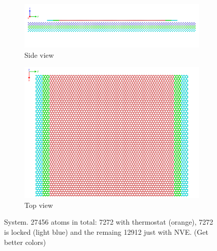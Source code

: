 \begin{figure}[H]
  \centering
  \begin{subfigure}[b]{0.80\textwidth}
      \centering
      \includegraphics[width=\textwidth]{figures/system_sideview.png}
      \caption{Side view}
      \label{fig:sideview}
  \end{subfigure}
  \hfill
  \begin{subfigure}[b]{0.80\textwidth}
      \centering
      \includegraphics[width=\textwidth]{figures/system_topview.png}
      \caption{Top view}
      \label{fig:topview}
  \end{subfigure}
  \hfill
     \caption{System. 27456 atoms in total: 7272 with thermostat (orange), 7272 is locked (light blue) and the remaing 12912 just with NVE. (Get better colors)}
     \label{fig:system}
\end{figure}




